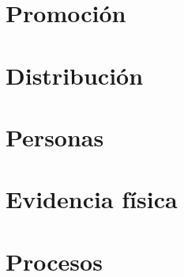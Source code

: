 \section{Promoción}

\section{Distribución}

\section{Personas}

\section{Evidencia física}

\section{Procesos}
